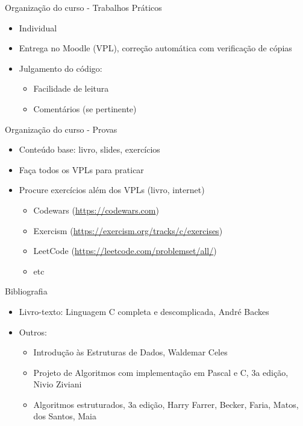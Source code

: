 \documentclass[t, aspectratio=169]{beamer}
\begin{document}
\begin{frame}[label={sec:org6d47566}]{Organização do curso - Trabalhos Práticos}
\begin{itemize}
\item Individual
\item Entrega no Moodle (VPL), correção automática com verificação de cópias
\item Julgamento do código:
\begin{itemize}
\item Facilidade de leitura
\item Comentários (se pertinente)
\end{itemize}
\end{itemize}
\end{frame}

\begin{frame}[label={sec:org2eecaaf}]{Organização do curso - Provas}
\begin{itemize}
\item Conteúdo base: livro, slides, exercícios
\item Faça todos os VPLs para praticar
\item Procure exercícios além dos VPLs (livro, internet)
\begin{itemize}
\item Codewars (\url{https://codewars.com})
\item Exercism (\url{https://exercism.org/tracks/c/exercises})
\item LeetCode (\url{https://leetcode.com/problemset/all/})
\item etc
\end{itemize}
\end{itemize}
\end{frame}

\begin{frame}[label={sec:org6121370}]{Bibliografia}
\begin{itemize}
\item Livro-texto: Linguagem C completa e descomplicada, André Backes

\item Outros:
\begin{itemize}
\item Introdução às Estruturas de Dados, Waldemar Celes
\item Projeto de Algoritmos com implementação em Pascal e C, 3a edição,
Nivio Ziviani
\item Algoritmos estruturados, 3a edição, Harry Farrer, Becker, Faria, Matos,
dos Santos, Maia
\end{itemize}
\end{itemize}
\end{frame}
\end{document}
